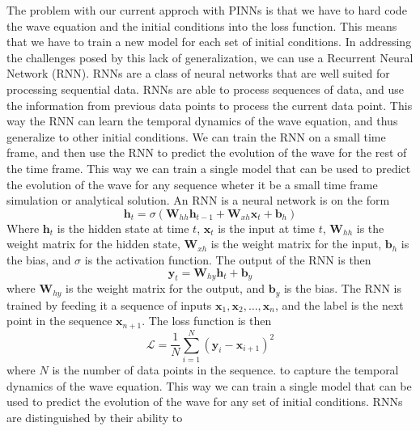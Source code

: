 \documentclass[twoside,11pt]{report}
\begin{document}
    The problem with our current approch with PINNs is that we have to hard code the wave equation and the initial
    conditions into the loss function. This means that we have to train a new model for each set of initial conditions.
    In addressing the challenges posed by this lack of generalization, we can use a Recurrent Neural Network (RNN).
    RNNs are a class of neural networks that are well suited for processing sequential data. RNNs are able to process
    sequences of data, and use the information from previous data points to process the current data point. This way
    the RNN can learn the temporal dynamics of the wave equation, and thus generalize to other initial conditions.
    We can train the RNN on a small time frame, and then use the RNN to predict the evolution of the wave for the rest
    of the time frame. This way we can train a single model that can be used to predict the evolution of the wave for
    any sequence wheter it be a small time frame simulation or analytical solution.
    An RNN is a neural network is on the form 
    \begin{equation}
        \mathbf{h}_t = \sigma(\mathbf{W}_{hh}\mathbf{h}_{t-1} + \mathbf{W}_{xh}\mathbf{x}_t + \mathbf{b}_h)
    \end{equation}
    Where $\mathbf{h}_t$ is the hidden state at time $t$, $\mathbf{x}_t$ is the input at time $t$, $\mathbf{W}_{hh}$
    is the weight matrix for the hidden state, $\mathbf{W}_{xh}$ is the weight matrix for the input, $\mathbf{b}_h$
    is the bias, and $\sigma$ is the activation function. The output of the RNN is then
    \begin{equation}
        \mathbf{y}_t = \mathbf{W}_{hy}\mathbf{h}_t + \mathbf{b}_y
    \end{equation}
    where $\mathbf{W}_{hy}$ is the weight matrix for the output, and $\mathbf{b}_y$ is the bias.
    The RNN is trained by feeding it a sequence of inputs $\mathbf{x}_1, \mathbf{x}_2, \dots, \mathbf{x}_n$,
    and the label is the next point in the sequence $\mathbf{x}_{n+1}$. The loss function is then
    \begin{equation}
        \mathcal{L} = \frac{1}{N}\sum_{i=1}^{N} (\mathbf{y}_i - \mathbf{x}_{i+1})^2
    \end{equation}
    where $N$ is the number of data points in the sequence.
    to capture the temporal dynamics of the wave equation. This way we can train a single model that can be used
    to predict the evolution of the wave for any set of initial conditions. RNNs are distinguished by their ability to 
\end{document}
